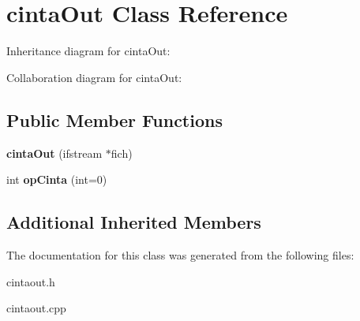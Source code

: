 \hypertarget{classcintaOut}{}\section{cinta\+Out Class Reference}
\label{classcintaOut}


Inheritance diagram for cinta\+Out\+:


Collaboration diagram for cinta\+Out\+:
\subsection*{Public Member Functions}
\begin{DoxyCompactItemize}
\item 
\hypertarget{classcintaOut_a4a1e6b965825e2a6f276a60e098dc352}{}{\bfseries cinta\+Out} (ifstream $\ast$fich)\label{classcintaOut_a4a1e6b965825e2a6f276a60e098dc352}

\item 
\hypertarget{classcintaOut_aded9cba819c67ce20df5b9fab0161692}{}int {\bfseries op\+Cinta} (int=0)\label{classcintaOut_aded9cba819c67ce20df5b9fab0161692}

\end{DoxyCompactItemize}
\subsection*{Additional Inherited Members}


The documentation for this class was generated from the following files\+:\begin{DoxyCompactItemize}
\item 
cintaout.\+h\item 
cintaout.\+cpp\end{DoxyCompactItemize}
